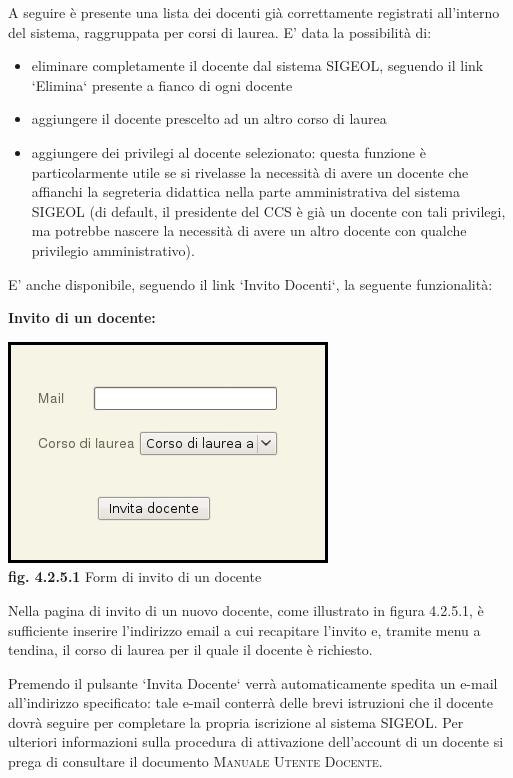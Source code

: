 \documentclass[11pt,a4paper]{article}
\begin{document}
A seguire è presente una lista dei docenti già correttamente registrati all'interno del sistema, raggruppata per corsi di laurea.
E' data la possibilità di:
\begin{itemize}
 \item eliminare completamente il docente dal sistema SIGEOL, seguendo il link `Elimina` presente a fianco di ogni docente
 \item aggiungere il docente prescelto ad un altro corso di laurea
 \item aggiungere dei privilegi al docente selezionato: questa funzione è particolarmente utile se si rivelasse la necessità di avere un docente che affianchi la segreteria didattica nella parte amministrativa del sistema SIGEOL (di default, il presidente del CCS è già un docente con tali privilegi, ma potrebbe nascere la necessità di avere un altro docente con qualche privilegio amministrativo).
\end{itemize}
E' anche disponibile, seguendo il link `Invito Docenti`, la seguente funzionalità:
\newline \newline
\begin{large}\textbf{Invito di un docente:}\end{large}

\begin{center}
	\includegraphics[scale=0.5]{images/invito_docenti.jpg}\\
	\textbf{fig. 4.2.5.1} Form di invito di un docente\\
\end{center}

Nella pagina di invito di un nuovo docente, come illustrato in figura 4.2.5.1, è sufficiente inserire l'indirizzo email a cui recapitare l'invito e, tramite menu a tendina, il corso di laurea per il quale il docente è richiesto.

Premendo il pulsante `Invita Docente` verrà automaticamente spedita un e-mail all'indirizzo specificato: tale e-mail conterrà delle brevi istruzioni che il docente dovrà seguire per completare la propria iscrizione al sistema SIGEOL.
Per ulteriori informazioni sulla procedura di attivazione dell'account di un docente si prega di consultare il documento \textsc{Manuale Utente Docente}.
\end{document}
